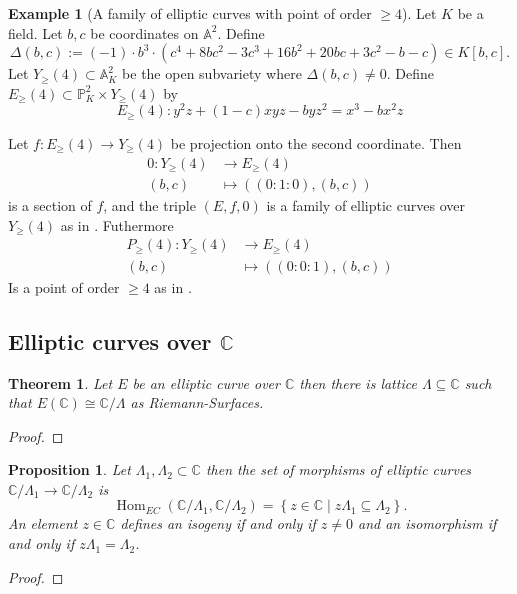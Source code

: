\documentclass[a4paper,12pt,reqno]{amsart}
\newcommand{\set}[1]{\left\lbrace #1 \right\rbrace}
\newcommand{\field}[1]{\mathbb{#1}}  %
\newcommand{\C}{\field{C}} %
\newcommand{\A}{\field{A}}
\renewcommand{\P}{\field{P}}
\DeclareMathOperator{\Hom}{Hom}
\newtheorem{theorem}[lemma]{Theorem}
\newtheorem{proposition}[lemma]{Proposition}
\theoremstyle{definition}
\newtheorem{example}[lemma]{Example}
\numberwithin{lemma}{section}
\numberwithin{equation}{section}
\numberwithin{figure}{section}
\begin{document}
\begin{example}[A family of elliptic curves with point of order $\geq 4$]\label{ex:y_geq_4}
	Let $K$ be a field. Let $b,c$ be coordinates on $\A^2$. Define $$\Delta(b,c) :=  \left(-1\right) \cdot b^{3} \cdot (c^{4} + 8 b c^{2} - 3 c^{3} + 16 b^{2} + 20 b c + 3 c^{2} - b - c) \in K[b,c].$$ Let $Y_{\geq }(4) \subset \A^2_K$ be the open subvariety where $\Delta(b,c) \neq 0$. Define $E_\geq(4) \subset \P^2_K \times Y_{\geq }(4)$ by $$E_{\geq}(4) : y^2z+(1-c)xyz-byz^2=x^3-bx^2z$$
\begin{comment}
R.<b,c> = QQ[]
E = EllipticCurve(R.fraction_field()[1-c,b,b,0,0])
E.discriminant().factor()
\end{comment}
Let $f : E_{\geq}(4) \to Y_{\geq}(4)$ be projection onto the second coordinate. Then \begin{align*}
0: Y_{\geq}(4) &\to E_{\geq}(4) \\
(b,c) &\mapsto ((0:1:0),(b,c))
\end{align*}
is a section of $f$, and the triple $(E,f,0)$ is a family of elliptic curves over $Y_{\geq}(4)$ as in . Futhermore
\begin{align*}
P_{\geq}(4): Y_{\geq}(4) &\to E_{\geq}(4) \\
(b,c) &\mapsto ((0:0:1),(b,c))
\end{align*}
Is a point of order $\geq 4$ as in .

\end{example}

\subsection{Elliptic curves over $\C$}
\begin{theorem}\label{stmt:complex-ec-is-C-mod-lattice}
	Let $E$ be an elliptic curve over $\C$ then there is lattice $\Lambda \subseteq \C$ such that $E(\C) \cong \C/\Lambda$ as Riemann-Surfaces.
\end{theorem}
\begin{proof}
\end{proof}

\begin{proposition}
	Let $\Lambda_1, \Lambda_2 \subset \C$ then the set of morphisms of elliptic curves $\C/\Lambda_1 \to \C/\Lambda_2$ is $$\Hom_{EC}(\C/\Lambda_1,\C/\Lambda_2) =\set{z \in \C \mid z\Lambda_1 \subseteq \Lambda_2}.$$ 
	An element $z \in \C$ defines an isogeny if and only if $z \neq 0$ and an isomorphism if and only if $z\Lambda_1 = \Lambda_2$.
\end{proposition}
\begin{proof}
\end{proof}
\end{document}
